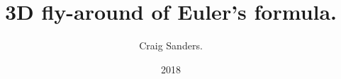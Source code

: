 \documentclass[aspectratio=169, final]{beamer}
\title{3D fly-around of Euler's formula.}
\author{Craig Sanders.}
\institute{Gravitas Toolworks}
\date{2018}
\begin{document}

\frame{\titlepage}


\iffalse

\begin{frame}[t]

	\frametitle{Table of Contents}

	\tableofcontents

\end{frame}

\fi





























% 
\end{document}
